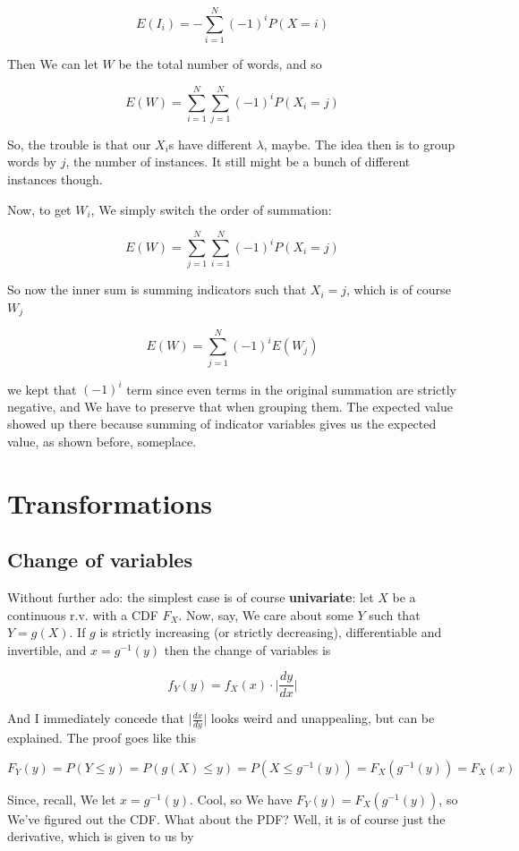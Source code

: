 \documentclass{article}
\begin{document}
			\[ E(I_i) = -\sum^N_{i=1}(-1)^iP(X=i) \]
			
			Then We can let $W$ be the total number of words, and so
			
			\[ E(W) =  \sum^N_{i=1}\sum^N_{j=1}(-1)^iP(X_i=j) \]
			
			So, the trouble is that our $X_i$s have different $\lambda$, maybe. The idea then is to group words by $j$, the number of instances. It still might be a bunch of different instances though. 
			
			Now, to get $W_i$, We simply switch the order of summation:
			
			\[ E(W) =  \sum^N_{j=1}\sum^N_{i=1}(-1)^iP(X_i=j) \]
			
			So now the inner sum is summing indicators such that $X_i = j$, which is of course $W_j$
			
			\[ E(W) =  \sum^N_{j=1}(-1)^iE(W_j) \]
			
			we kept that $(-1)^i$ term since even terms in the original summation are strictly negative, and We have to preserve that when grouping them. The expected value showed up there because summing of indicator variables gives us the expected value, as shown before, someplace.
			
\newpage
\section{Transformations}

	\subsection{Change of variables}
	
		Without further ado: the simplest case is of course \textbf{univariate}: let $X$ be a continuous r.v. with a CDF $F_X$. Now, say, We care about some $Y$ such that $Y = g(X)$. If $g$ is strictly increasing (or strictly decreasing), differentiable and invertible, and $x = g^{-1}(y)$ then the change of variables is
		
		\[ f_Y(y) = f_X(x)\cdot \bigg|\frac{dy}{dx}\bigg| \]
			
		And I immediately concede that $\big|\frac{dx}{dy}\big|$ looks weird and unappealing, but can be explained. The proof goes like this
		
		\[ F_Y(y) = P(Y\le y) = P(g(X)\le y) = P(X\le g^{-1}(y)) = F_X(g^{-1}(y)) = F_X(x) \]
			
		Since, recall, We let $x=g^{-1}(y)$. Cool, so We have $F_Y(y) = F_X(g^{-1}(y))$, so We've figured out the CDF. What about the PDF? Well, it is of course just the derivative, which is given to us by
		
\end{document}
